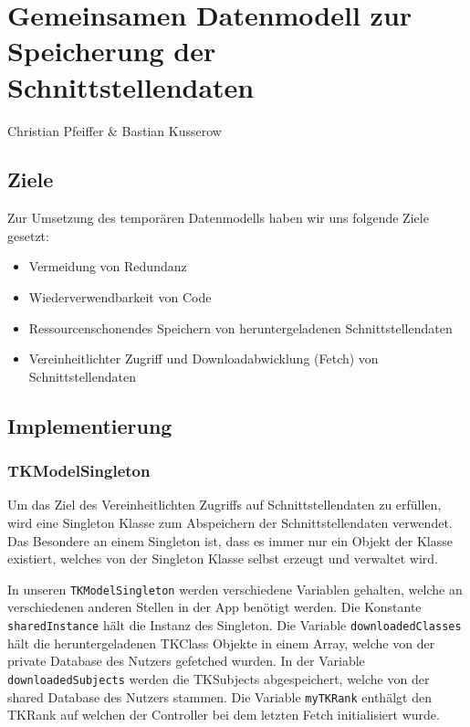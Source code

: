 \chapter{Gemeinsamen Datenmodell zur Speicherung der Schnittstellendaten}
Christian Pfeiffer \& Bastian Kusserow
\section{Ziele}
Zur Umsetzung des temporären Datenmodells haben wir uns folgende Ziele gesetzt:

\begin{itemize}
\item Vermeidung von Redundanz
\item Wiederverwendbarkeit von Code
\item Ressourcenschonendes Speichern von heruntergeladenen Schnittstellendaten
\item Vereinheitlichter Zugriff und Downloadabwicklung (Fetch) von Schnittstellendaten
\end{itemize}

\section{Implementierung}

\subsection{TKModelSingleton} \label{TKModelSingleton}
Um das Ziel des Vereinheitlichten Zugriffs auf Schnittstellendaten zu erfüllen, wird eine Singleton Klasse zum Abspeichern der Schnittstellendaten verwendet.
Das Besondere an einem Singleton ist, dass es immer nur ein Objekt der Klasse existiert, welches von der Singleton Klasse selbst erzeugt und verwaltet wird. 



In unseren \texttt{TKModelSingleton} werden verschiedene Variablen gehalten, welche an verschiedenen anderen Stellen in der App benötigt werden. Die Konstante \texttt{sharedInstance} hält die Instanz des Singleton. Die Variable \texttt{downloadedClasses} hält die heruntergeladenen TKClass Objekte in einem Array, welche von der private Database des Nutzers gefetched wurden. In der Variable \texttt{downloadedSubjects} werden die TKSubjects abgespeichert, welche von der shared Database des Nutzers stammen. Die Variable \texttt{myTKRank} enthälgt den TKRank auf welchen der Controller bei dem letzten Fetch initialisiert wurde.


